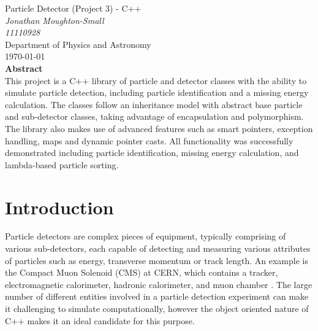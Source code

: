\documentclass[12pt]{report}
\begin{document}
\newpage

\begin{center}
{\Huge Particle Detector (Project 3) - C++}\\[0.5cm] 
\textit{Jonathan Moughton-Small}\\[0.3cm] 
\textit{11110928}~\\[0.3cm]
Department of Physics and Astronomy~\\[0.3cm]
\today~\\[0.8cm]

{\Large \textbf{Abstract}~\\[0.3cm]}
This project is a C++ library of particle and detector classes with the ability to simulate particle detection, including particle identification and a missing energy calculation. The classes follow an inheritance model with abstract base particle and sub-detector classes, taking advantage of encapsulation and polymorphism. The library also makes use of advanced features such as smart pointers, exception handling, maps and dynamic pointer casts. All functionality was successfully demonstrated including particle identification, missing energy calculation, and lambda-based particle sorting.
\end{center}

\renewcommand{\thesection}{\arabic{section}.}
\renewcommand{\thesubsection}{\arabic{section}.\arabic{subsection}}

\setcounter{page}{1}

\section{Introduction} 

Particle detectors are complex pieces of equipment, typically comprising of various sub-detectors, each capable of detecting and measuring various attributes of particles such as energy, transverse momentum or track length. An example is the Compact Muon Solenoid (CMS) at CERN, which contains a tracker, electromagnetic calorimeter, hadronic calorimeter, and muon chamber \cite{CMS}. The large number of different entities involved in a particle detection experiment can make it challenging to simulate computationally, however the object oriented nature of C++ makes it an ideal candidate for this purpose.\\
\end{document}
